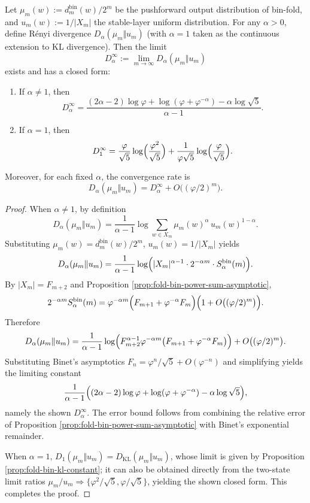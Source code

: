 \begin{theorem}\label{thm:fold-bin-renyi-divergence-limit}
Let \(\mu_m(w):=d^{\mathrm{bin}}_m(w)/2^m\) be the pushforward output distribution of bin-fold, and \(u_m(w):=1/|X_m|\) the stable-layer uniform distribution.
For any \(\alpha>0\), define Rényi divergence \(D_\alpha(\mu_m\Vert u_m)\) (with \(\alpha=1\) taken as the continuous extension to KL divergence).
Then the limit
\[
D_\alpha^\infty:=\lim_{m\to\infty}D_\alpha(\mu_m\Vert u_m)
\]
exists and has a closed form:
\begin{enumerate}
  \item If \(\alpha\neq 1\), then
  \[
  D_\alpha^\infty=\frac{(2\alpha-2)\log\varphi+\log(\varphi+\varphi^{-\alpha})-\alpha\log\sqrt{5}}{\alpha-1}.
  \]
  \item If \(\alpha=1\), then
  \[
  D_1^\infty=\frac{\varphi}{\sqrt5}\log\Bigl(\frac{\varphi^2}{\sqrt5}\Bigr)+\frac{1}{\varphi\sqrt5}\log\Bigl(\frac{\varphi}{\sqrt5}\Bigr).
  \]
\end{enumerate}
Moreover, for each fixed \(\alpha\), the convergence rate is
\[
D_\alpha(\mu_m\Vert u_m)=D_\alpha^\infty+O\bigl((\varphi/2)^m\bigr).
\]
\end{theorem}

\begin{proof}
When \(\alpha\neq 1\), by definition
\[
D_\alpha(\mu_m\Vert u_m)
=\frac{1}{\alpha-1}\log\sum_{w\in X_m}\mu_m(w)^\alpha\,u_m(w)^{1-\alpha}.
\]
Substituting \(\mu_m(w)=d^{\mathrm{bin}}_m(w)/2^m\), \(u_m(w)=1/|X_m|\) yields
\[
D_\alpha(\mu_m\Vert u_m)
=\frac{1}{\alpha-1}\log\Bigl(|X_m|^{\alpha-1}\cdot 2^{-\alpha m}\cdot S_\alpha^{\mathrm{bin}}(m)\Bigr).
\]
By \(|X_m|=F_{m+2}\) and Proposition \ref{prop:fold-bin-power-sum-asymptotic},
\[
2^{-\alpha m}S_\alpha^{\mathrm{bin}}(m)
=\varphi^{-\alpha m}\Bigl(F_{m+1}+\varphi^{-\alpha}F_m\Bigr)\Bigl(1+O\bigl((\varphi/2)^m\bigr)\Bigr).
\]
Therefore
\[
D_\alpha(\mu_m\Vert u_m)
=\frac{1}{\alpha-1}\log\Bigl(F_{m+2}^{\alpha-1}\varphi^{-\alpha m}\bigl(F_{m+1}+\varphi^{-\alpha}F_m\bigr)\Bigr)
+O\bigl((\varphi/2)^m\bigr).
\]
Substituting Binet's asymptotics \(F_n=\varphi^n/\sqrt5+O(\varphi^{-n})\) and simplifying yields the limiting constant
\[
\frac{1}{\alpha-1}\Bigl((2\alpha-2)\log\varphi+\log(\varphi+\varphi^{-\alpha})-\alpha\log\sqrt5\Bigr),
\]
namely the shown \(D_\alpha^\infty\). The error bound follows from combining the relative error of Proposition \ref{prop:fold-bin-power-sum-asymptotic} with Binet's exponential remainder.
\par
When \(\alpha=1\), \(D_1(\mu_m\Vert u_m)=D_{\mathrm{KL}}(\mu_m\Vert u_m)\), whose limit is given by Proposition \ref{prop:fold-bin-kl-constant}; it can also be obtained directly from the two-state limit ratios \(\mu_m/u_m\Rightarrow\{\varphi^2/\sqrt5,\varphi/\sqrt5\}\), yielding the shown closed form. This completes the proof.
\end{proof}

